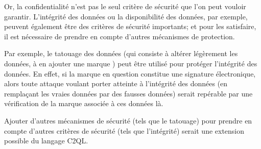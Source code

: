 Or, la confidentialité n'est pas le seul critère
de sécurité que l'on peut vouloir garantir.
L'intégrité des données ou la disponibilité des données,
par exemple, peuvent également être des critères 
de sécurité importants; et pour les satisfaire,
il est nécessaire de prendre en compte d'autres
mécanismes de protection.

Par exemple, le tatouage des données 
(qui consiste à altérer légèrement les données,
à en ajouter une \og marque \fg{}) peut être utilisé
pour protéger l'intégrité des données.
En effet, si la marque en question constitue une
signature électronique, alors toute attaque voulant porter
atteinte à l'intégrité des données (en remplaçant les 
vraies données par des fausses données) serait
repérable par une vérification de la marque
associée à ces données là.

Ajouter d'autres mécanismes de sécurité
(tels que le tatouage) pour prendre en compte
d'autres critères de sécurité (tels que l'intégrité)
serait une extension possible du langage C2QL.